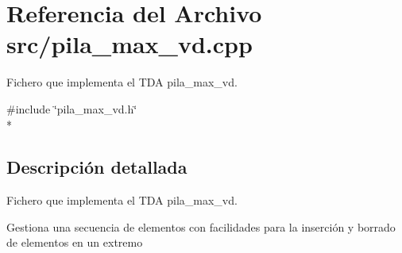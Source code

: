 \section{Referencia del Archivo src/pila\+\_\+max\+\_\+vd.cpp}
\label{pila__max__vd_8cpp}


Fichero que implementa el T\+DA pila\+\_\+max\+\_\+vd.  


{\ttfamily \#include \char`\"{}pila\+\_\+max\+\_\+vd.\+h\char`\"{}}\\*


\subsection{Descripción detallada}
Fichero que implementa el T\+DA pila\+\_\+max\+\_\+vd. 

Gestiona una secuencia de elementos con facilidades para la inserción y borrado de elementos en un extremo 
